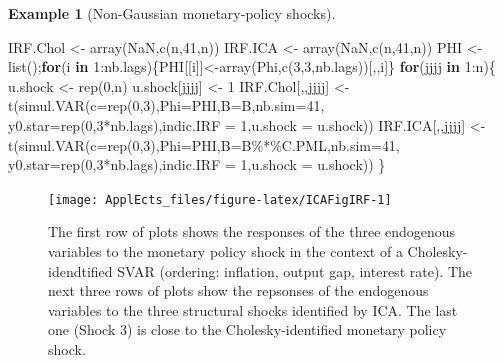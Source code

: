\documentclass[
  12pt,
]{book}
\newenvironment{Shaded}{\begin{snugshade}}{\end{snugshade}}
\newcommand{\AttributeTok}[1]{\textcolor[rgb]{0.77,0.63,0.00}{#1}}
\newcommand{\ConstantTok}[1]{\textcolor[rgb]{0.00,0.00,0.00}{#1}}
\newcommand{\ControlFlowTok}[1]{\textcolor[rgb]{0.13,0.29,0.53}{\textbf{#1}}}
\newcommand{\DecValTok}[1]{\textcolor[rgb]{0.00,0.00,0.81}{#1}}
\newcommand{\FunctionTok}[1]{\textcolor[rgb]{0.00,0.00,0.00}{#1}}
\newcommand{\NormalTok}[1]{#1}
\newcommand{\OtherTok}[1]{\textcolor[rgb]{0.56,0.35,0.01}{#1}}
\newcommand{\SpecialCharTok}[1]{\textcolor[rgb]{0.00,0.00,0.00}{#1}}
\theoremstyle{definition}
\theoremstyle{definition}
\newtheorem{example}{Example}[chapter]
\theoremstyle{definition}
\theoremstyle{definition}
\theoremstyle{remark}
\begin{document}
\begin{example}[Non-Gaussian monetary-policy shocks]
\begin{Shaded}
\begin{Highlighting}[]
\NormalTok{IRF.Chol }\OtherTok{\textless{}{-}} \FunctionTok{array}\NormalTok{(}\ConstantTok{NaN}\NormalTok{,}\FunctionTok{c}\NormalTok{(n,}\DecValTok{41}\NormalTok{,n))}
\NormalTok{IRF.ICA  }\OtherTok{\textless{}{-}} \FunctionTok{array}\NormalTok{(}\ConstantTok{NaN}\NormalTok{,}\FunctionTok{c}\NormalTok{(n,}\DecValTok{41}\NormalTok{,n))}
\NormalTok{PHI }\OtherTok{\textless{}{-}} \FunctionTok{list}\NormalTok{();}\ControlFlowTok{for}\NormalTok{(i }\ControlFlowTok{in} \DecValTok{1}\SpecialCharTok{:}\NormalTok{nb.lags)\{PHI[[i]]}\OtherTok{\textless{}{-}}\FunctionTok{array}\NormalTok{(Phi,}\FunctionTok{c}\NormalTok{(}\DecValTok{3}\NormalTok{,}\DecValTok{3}\NormalTok{,nb.lags))[,,i]\}}
\ControlFlowTok{for}\NormalTok{(jjjj }\ControlFlowTok{in} \DecValTok{1}\SpecialCharTok{:}\NormalTok{n)\{}
\NormalTok{  u.shock }\OtherTok{\textless{}{-}} \FunctionTok{rep}\NormalTok{(}\DecValTok{0}\NormalTok{,n)}
\NormalTok{  u.shock[jjjj] }\OtherTok{\textless{}{-}} \DecValTok{1}
\NormalTok{  IRF.Chol[,,jjjj] }\OtherTok{\textless{}{-}} 
    \FunctionTok{t}\NormalTok{(}\FunctionTok{simul.VAR}\NormalTok{(}\AttributeTok{c=}\FunctionTok{rep}\NormalTok{(}\DecValTok{0}\NormalTok{,}\DecValTok{3}\NormalTok{),}\AttributeTok{Phi=}\NormalTok{PHI,}\AttributeTok{B=}\NormalTok{B,}\AttributeTok{nb.sim=}\DecValTok{41}\NormalTok{,}
                \AttributeTok{y0.star=}\FunctionTok{rep}\NormalTok{(}\DecValTok{0}\NormalTok{,}\DecValTok{3}\SpecialCharTok{*}\NormalTok{nb.lags),}\AttributeTok{indic.IRF =} \DecValTok{1}\NormalTok{,}\AttributeTok{u.shock =}\NormalTok{ u.shock))}
\NormalTok{  IRF.ICA[,,jjjj]  }\OtherTok{\textless{}{-}} 
    \FunctionTok{t}\NormalTok{(}\FunctionTok{simul.VAR}\NormalTok{(}\AttributeTok{c=}\FunctionTok{rep}\NormalTok{(}\DecValTok{0}\NormalTok{,}\DecValTok{3}\NormalTok{),}\AttributeTok{Phi=}\NormalTok{PHI,}\AttributeTok{B=}\NormalTok{B}\SpecialCharTok{\%*\%}\NormalTok{C.PML,}\AttributeTok{nb.sim=}\DecValTok{41}\NormalTok{,}
                \AttributeTok{y0.star=}\FunctionTok{rep}\NormalTok{(}\DecValTok{0}\NormalTok{,}\DecValTok{3}\SpecialCharTok{*}\NormalTok{nb.lags),}\AttributeTok{indic.IRF =} \DecValTok{1}\NormalTok{,}\AttributeTok{u.shock =}\NormalTok{ u.shock))}
\NormalTok{\}}
\end{Highlighting}
\end{Shaded}

\begin{figure}
\texttt{[image: ApplEcts\_files/figure-latex/ICAFigIRF-1]} \caption{The first row of plots shows the responses of the three endogenous variables to the monetary policy shock in the context of a Cholesky-idendtified SVAR (ordering: inflation, output gap, interest rate). The next three rows of plots show the repsonses of the endogenous variables to the three structural shocks identified by ICA. The last one (Shock 3) is close to the Cholesky-identified monetary policy shock.}\label{fig:ICAFigIRF}
\end{figure}


\end{example}
\end{document}

